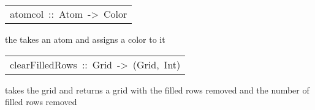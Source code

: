 \begin{haddockdesc}
\item[\begin{tabular}{@{}l}
atomcol\ ::\ Atom\ ->\ Color
\end{tabular}]\haddockbegindoc
the  takes an atom and assigns a color to it \par

\end{haddockdesc}
\begin{haddockdesc}
\item[\begin{tabular}{@{}l}
clearFilledRows\ ::\ Grid\ ->\ (Grid,\ Int)
\end{tabular}]\haddockbegindoc
{} takes the grid and returns a grid with the filled rows removed and the number of filled rows removed\par

\end{haddockdesc}